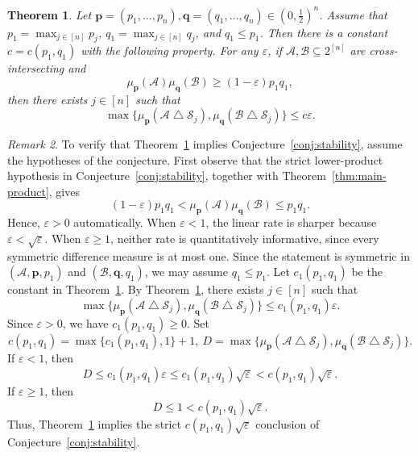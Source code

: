 \documentclass[11pt]{article}
\numberwithin{equation}{section}
\newtheorem{theorem}{Theorem}[section]
\theoremstyle{definition}
\theoremstyle{remark}
\newtheorem{remark}[theorem]{Remark}
\newcommand{\symdiff}{\mathbin{\triangle}}
\begin{document}
\begin{theorem}\label{thm:main-stability}
Let $\mathbf p=(p_1,\ldots,p_n), \mathbf q=(q_1,\ldots,q_n)\in(0,\frac{1}{2})^n$. Assume that $p_1=\max_{j\in[n]}p_j$, $q_1=\max_{j\in[n]}q_j$, and $q_1\leq p_1$. Then there is a constant $c=c(p_1,q_1)$ with the following property. For any $\varepsilon$, if $\mathcal{A},\mathcal{B}\subseteq2^{[n]}$ are cross-intersecting and
\begin{equation*}
 \mu_{\mathbf p}(\mathcal{A})\mu_{\mathbf q}(\mathcal{B})\geq(1-\varepsilon)p_1q_1,
\end{equation*}
then there exists $j\in[n]$ such that
$$
 \max\bigl\{
 \mu_{\mathbf p}(\mathcal{A}\symdiff\mathcal{S}_j),
 \mu_{\mathbf q}(\mathcal{B}\symdiff\mathcal{S}_j)
 \bigr\}
 \leq c\varepsilon.
 $$
\end{theorem}





\medskip
\begin{remark}
To verify that Theorem~\ref{thm:main-stability} implies
Conjecture~\ref{conj:stability}, assume the hypotheses of the
conjecture.
First observe that the strict lower-product hypothesis in
Conjecture~\ref{conj:stability}, together with
Theorem~\ref{thm:main-product}, gives
\begin{equation*}
 (1-\varepsilon)p_1q_1
 <
 \mu_{\mathbf p}(\mathcal{A})\mu_{\mathbf q}(\mathcal{B})
 \leq p_1q_1.
\end{equation*}
Hence, $\varepsilon>0$ automatically.
When $\varepsilon<1$, the linear rate is
sharper because $\varepsilon<\sqrt{\varepsilon}$. When
$\varepsilon\geq1$, neither rate is quantitatively informative, since
every symmetric difference measure is at most one.
Since the statement is symmetric in
$(\mathcal{A},\mathbf p, p_1)$ and $(\mathcal{B},\mathbf q, q_1)$, we may assume  $q_1\leq p_1$.
Let $c_1(p_1,q_1)$ be the constant in
Theorem~\ref{thm:main-stability}.
By Theorem~\ref{thm:main-stability},  there exists $j\in[n]$ such that
$$
 \max\bigl\{
 \mu_{\mathbf p}(\mathcal{A}\symdiff\mathcal{S}_j),
 \mu_{\mathbf q}(\mathcal{B}\symdiff\mathcal{S}_j)
 \bigr\}
 \leq c_1(p_1,q_1)\varepsilon.
 $$
Since $\varepsilon>0$, we have $c_1(p_1,q_1)\geq 0$. 
Set
\begin{equation*}
c(p_1,q_1)=\max\{c_1(p_1,q_1), 1\}+1,\
 D=
 \max\bigl\{
 \mu_{\mathbf p}(\mathcal{A}\symdiff\mathcal{S}_j),
 \mu_{\mathbf q}(\mathcal{B}\symdiff\mathcal{S}_j)
 \bigr\}.
\end{equation*}
If $\varepsilon<1$, then
\begin{equation*}
 D\leq c_1(p_1,q_1)\varepsilon
 \leq c_1(p_1,q_1)\sqrt{\varepsilon}
 <c(p_1,q_1)\sqrt{\varepsilon}.
\end{equation*}
If $\varepsilon\geq1$,  then
\begin{equation*}
 D\leq1
 <c(p_1,q_1)\sqrt{\varepsilon}.
\end{equation*}
Thus, Theorem~\ref{thm:main-stability} implies the strict
$c(p_1,q_1)\sqrt{\varepsilon}$ conclusion of
Conjecture~\ref{conj:stability}.
\end{remark}
\end{document}
